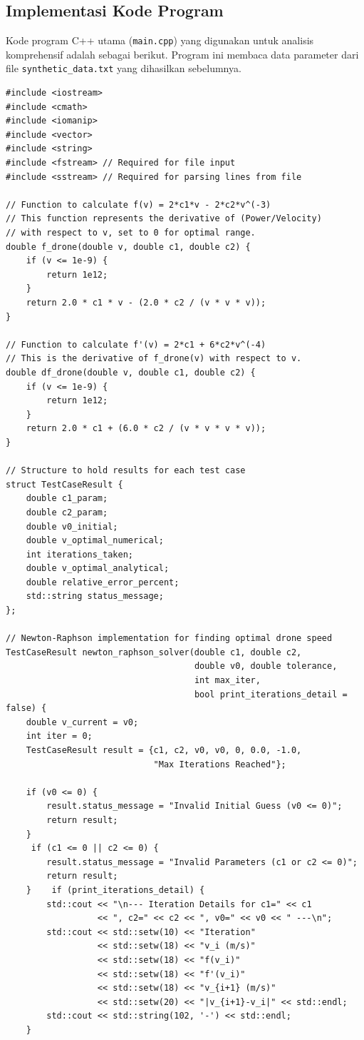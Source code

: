\documentclass[conference]{IEEEtran}
\begin{document}
\subsection{Implementasi Kode Program}
Kode program C++ utama (\texttt{main.cpp}) yang digunakan untuk analisis komprehensif adalah sebagai berikut. Program ini membaca data parameter dari file \texttt{synthetic\_data.txt} yang dihasilkan sebelumnya.
\begingroup %
\tiny %
\begin{verbatim}
#include <iostream>
#include <cmath>
#include <iomanip>
#include <vector>
#include <string>
#include <fstream> // Required for file input
#include <sstream> // Required for parsing lines from file

// Function to calculate f(v) = 2*c1*v - 2*c2*v^(-3)
// This function represents the derivative of (Power/Velocity) 
// with respect to v, set to 0 for optimal range.
double f_drone(double v, double c1, double c2) {
    if (v <= 1e-9) { 
        return 1e12; 
    }
    return 2.0 * c1 * v - (2.0 * c2 / (v * v * v));
}

// Function to calculate f'(v) = 2*c1 + 6*c2*v^(-4)
// This is the derivative of f_drone(v) with respect to v.
double df_drone(double v, double c1, double c2) {
    if (v <= 1e-9) {
        return 1e12; 
    }
    return 2.0 * c1 + (6.0 * c2 / (v * v * v * v));
}

// Structure to hold results for each test case
struct TestCaseResult {
    double c1_param; 
    double c2_param; 
    double v0_initial;
    double v_optimal_numerical;
    int iterations_taken;
    double v_optimal_analytical;
    double relative_error_percent;
    std::string status_message;
};

// Newton-Raphson implementation for finding optimal drone speed
TestCaseResult newton_raphson_solver(double c1, double c2, 
                                     double v0, double tolerance, 
                                     int max_iter, 
                                     bool print_iterations_detail = false) {
    double v_current = v0;
    int iter = 0;
    TestCaseResult result = {c1, c2, v0, v0, 0, 0.0, -1.0, 
                             "Max Iterations Reached"};

    if (v0 <= 0) {
        result.status_message = "Invalid Initial Guess (v0 <= 0)";
        return result;
    }
     if (c1 <= 0 || c2 <= 0) {
        result.status_message = "Invalid Parameters (c1 or c2 <= 0)";
        return result;
    }    if (print_iterations_detail) {
        std::cout << "\n--- Iteration Details for c1=" << c1 
                  << ", c2=" << c2 << ", v0=" << v0 << " ---\n";
        std::cout << std::setw(10) << "Iteration"
                  << std::setw(18) << "v_i (m/s)"
                  << std::setw(18) << "f(v_i)"
                  << std::setw(18) << "f'(v_i)"
                  << std::setw(18) << "v_{i+1} (m/s)"
                  << std::setw(20) << "|v_{i+1}-v_i|" << std::endl;
        std::cout << std::string(102, '-') << std::endl;
    }


\end{verbatim}
\end{document}
